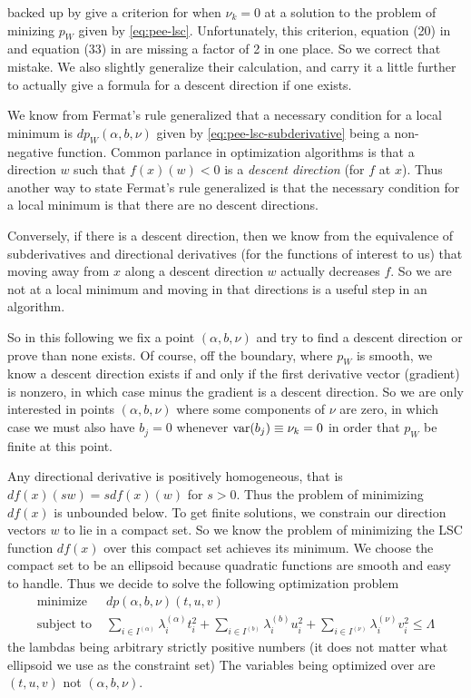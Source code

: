 \citet[Section~4]{reaster} backed up by \citet[Section~1.10.4]{reaster-tr}
give a criterion for when $\nu_k = 0$ at a solution to the problem of minizing
$p_W$ given by \eqref{eq:pee-lsc}.  Unfortunately, this criterion,
equation (20) in \citet{reaster} and equation (33)  in \citet{reaster-tr}
are missing a factor of {2} in one place.
So we correct that mistake.
We also slightly generalize their calculation,
and carry it a little further to actually give a formula for a descent
direction if one exists.

We know from Fermat's rule generalized that a necessary condition for
a local minimum is $d p_W(\alpha, b, \nu)$
given by \eqref{eq:pee-lsc-subderivative} being a non-negative function.
Common parlance in optimization algorithms is that a direction $w$ such
that $f(x)(w) < 0$ is a \emph{descent direction} (for $f$ at $x$).
Thus another way to state Fermat's rule generalized is that the necessary
condition for a local minimum is that there are no descent directions.

Conversely, if there is a descent direction, then we know from the
equivalence of subderivatives and directional derivatives (for the
functions of interest to us) that moving away from $x$ along a descent
direction $w$ actually decreases $f$.  So we are not at a local minimum
and moving in that directions is a useful step in an algorithm.

So in this following we fix a point $(\alpha, b, \nu)$ and try to find
a descent direction or prove than none exists.  Of course, off the boundary,
where $p_W$ is smooth, we know a descent direction exists if and only if
the first derivative vector (gradient) is nonzero, in which case minus
the gradient is a descent direction.  So we are only interested in points
$(\alpha, b, \nu)$ where some components of $\nu$ are zero, in which case
we must also have $b_j = 0$ whenever $\operatorname{var}(b_j) \equiv \nu_k = 0$
in order that $p_W$ be finite at this point.

Any directional derivative is positively homogeneous, that is
$d f(x)(s w) = s d f(x)(w)$ for $s > 0$.  Thus the problem of minimizing
$d f(x)$ is unbounded below.  To get finite solutions, we constrain our
direction vectors $w$ to lie in a compact set.  So we know the problem
of minimizing the LSC function $d f(x)$ over this compact set achieves its
minimum.  We choose the compact set to be an ellipsoid because quadratic
functions are smooth and easy to handle.  Thus we decide to solve the following
optimization problem
\begin{subequations}
\begin{align}
   \text{minimize } & d p(\alpha, b, \nu)(t, u, v)
   \label{eq:problem-objfun}
   \\
   \text{subject to } &
   \sum_{i \in I^{(\alpha)}} \lambda^{(\alpha)}_i t_i^2
   + \sum_{i \in I^{(b)}} \lambda^{(b)}_i u_i^2
   + \sum_{i \in I^{(\nu)}} \lambda^{(\nu)}_i v_i^2
   \le \Lambda
   \label{eq:problem-consfun}
\end{align}
\end{subequations}
the lambdas being arbitrary strictly positive numbers
(it does not matter what ellipsoid we use as the constraint set)
The variables being optimized over are $(t, u, v)$ not $(\alpha, b, \nu)$.

